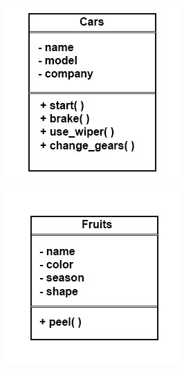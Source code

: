 \documentclass[11pt]{article}
\begin{document}
\begin{center}
\includegraphics[width=.9\linewidth]{./img/cars_uml.jpg}
\end{center} \begin{center}
\includegraphics[width=.9\linewidth]{./img/fruits_uml.jpg}
\end{center}
\end{document}
